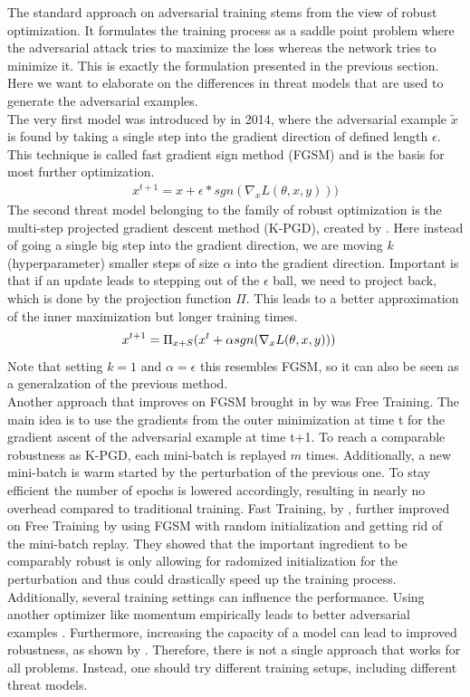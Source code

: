 \documentclass{article}
\begin{document}
The standard approach on adversarial training stems from the view of robust optimization. It formulates the training process as a saddle point problem where the adversarial attack tries to maximize the loss whereas the network tries to minimize it. This is exactly the formulation presented in the previous section. Here we want to elaborate on the differences in threat models that are used to generate the adversarial examples. \\
The very first model was introduced by \cite{b9} in 2014, where the adversarial example $\tilde{x}$ is found by taking a single step into the gradient direction of defined length $\epsilon$. This technique is called fast gradient sign method (FGSM) and is the basis for most further optimization.
\begin{align*}
  x^{t+1} = x + \epsilon * sgn(\nabla_x L(\theta,x,y)))
\end{align*}
The second threat model belonging to the family of robust optimization is the multi-step projected gradient descent method (K-PGD), created by \cite{b28}. Here instead of going a single big step into the gradient direction, we are moving $k$ (hyperparameter) smaller steps of size $\alpha$ into the gradient direction. Important is that if an update leads to stepping out of the $\epsilon$ ball, we need to project back, which is done by the projection function $\Pi$. This leads to a better approximation of the inner maximization but longer training times. 
\begin{align*}
    x^{t+1} &= \Pi_{x+S} (x^t + \alpha \space sgn(\nabla_x L(\theta,x,y)))
\end{align*}
Note that setting $k=1$ and $\alpha=\epsilon$ this resembles FGSM, so it can also be seen as a generalzation of the previous method. \\
Another approach that improves on FGSM brought in by \cite{b5} was Free Training. The main idea is to use the gradients from the outer minimization at time t for the gradient ascent of the adversarial example at time t+1. To reach a comparable robustness as K-PGD, each mini-batch is replayed $m$ times. Additionally, a new mini-batch is warm started by the perturbation of the previous one. To stay efficient the number of epochs is lowered accordingly, resulting in nearly no overhead compared to traditional training.
Fast Training, by \cite{b3}, further improved on Free Training by using FGSM with random initialization and getting rid of the mini-batch replay. They showed that the important ingredient to be comparably robust is only allowing for radomized initialization for the perturbation and thus could drastically speed up the training process. \\
Additionally, several training settings can influence the performance. Using another optimizer like momentum empirically leads to better adversarial examples \cite{b29}. Furthermore, increasing the capacity of a model can lead to improved robustness, as shown by \cite{b2}. Therefore, there is not a single approach that works for all problems. Instead, one should try different training setups, including different threat models.
  
\end{document}
